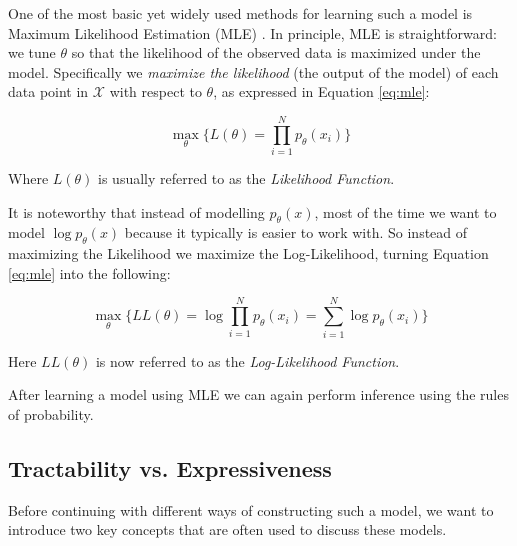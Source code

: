 One of the most basic yet widely used methods for learning such a model is Maximum Likelihood Estimation (MLE) \cite{ml_book}. 
In principle, MLE is straightforward: we tune $\theta$ so that the likelihood of the observed data is maximized under the model.
Specifically we \emph{maximize the likelihood} (the output of the model) of each data point in $\mathcal{X}$ with respect to $\theta$, as 
expressed in Equation \ref{eq:mle}: 

\begin{equation}
    \max_{\theta} \{ L(\theta) = \prod_{i=1}^{N} p_\theta(x_i) \}
    \label{eq:mle}
\end{equation}

Where $L(\theta)$ is usually referred to as the \emph{Likelihood Function}.

It is noteworthy that instead of modelling $p_\theta(x)$, most of the time we want to model $\log p_\theta(x)$ because it typically is easier to work with. 
So instead of maximizing the Likelihood we maximize the Log-Likelihood, turning Equation \ref{eq:mle} into the following:

\begin{equation}
    \max_{\theta} \{ LL(\theta) = \log \prod_{i=1}^{N} p_\theta(x_i) = \sum_{i=1}^{N} \log p_\theta(x_i) \}
    \label{eq:log_mle}
\end{equation}

Here $LL(\theta)$ is now referred to as the \emph{Log-Likelihood Function}. 

After learning a model using MLE we can again perform inference using the rules of probability. 

\subsection{Tractability vs. Expressiveness}

Before continuing with different ways of constructing such a model, we want to introduce two key concepts that are often 
used to discuss these models. 

